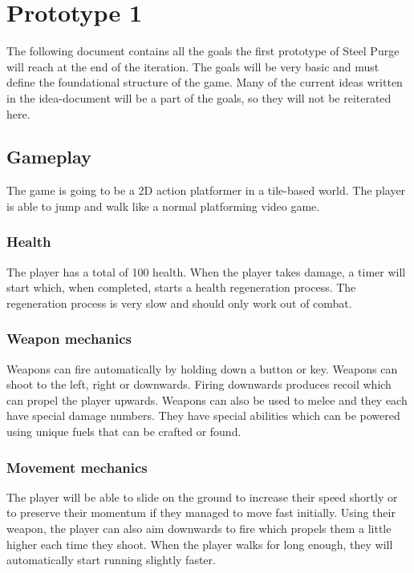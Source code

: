\documentclass[../Main.tex]{subfiles}
\begin{document}
\section{Prototype 1}

The following document contains all the goals the first prototype of Steel Purge will reach at the end of the iteration. The goals will be very basic and must define the foundational structure of the game. Many of the current ideas written in the idea-document will be a part of the goals, so they will not be reiterated here.

\subsection{Gameplay}

The game is going to be a 2D action platformer in a tile-based world. The player is able to jump and walk like a normal platforming video game.

\subsubsection{Health}

The player has a total of 100 health. When the player takes damage, a timer will start which, when completed, starts a health regeneration process. The regeneration process is very slow and should only work out of combat. 

\subsubsection{Weapon mechanics}

Weapons can fire automatically by holding down a button or key. Weapons can shoot to the left, right or downwards. Firing downwards produces recoil which can propel the player upwards. Weapons can also be used to melee and they each have special damage numbers. They have special abilities which can be powered using unique fuels that can be crafted or found. 

\subsubsection{Movement mechanics}

The player will be able to slide on the ground to increase their speed shortly or to preserve their momentum if they managed to move fast initially. Using their weapon, the player can also aim downwards to fire which propels them a little higher each time they shoot. When the player walks for long enough, they will automatically start running slightly faster.
\end{document}
